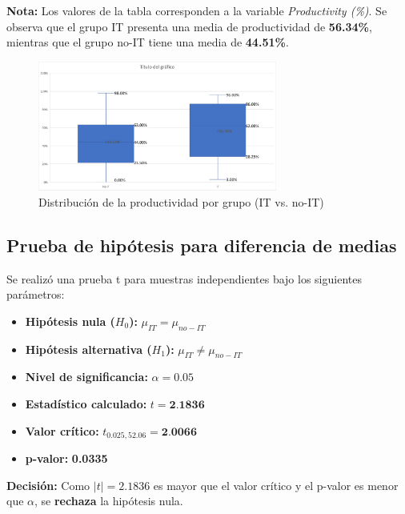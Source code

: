 \vspace{0.5cm}

\noindent
\textbf{Nota:} Los valores de la tabla corresponden a la variable \textit{Productivity (\%)}. Se observa que el grupo IT presenta una media de productividad de \textbf{56.34\%}, mientras que el grupo no-IT tiene una media de \textbf{44.51\%}.

\begin{figure}[H]
    \centering
    \includegraphics[width=0.7\textwidth]{assets/Boxplot.png}
    \caption{Distribución de la productividad por grupo (IT vs. no-IT)}
\end{figure}

\subsection{Prueba de hipótesis para diferencia de medias}

Se realizó una prueba t para muestras independientes bajo los siguientes parámetros:

\begin{itemize}
    \item \textbf{Hipótesis nula ($H_0$):} $\mu_{IT} = \mu_{no-IT}$
    \item \textbf{Hipótesis alternativa ($H_1$):} $\mu_{IT} \neq \mu_{no-IT}$
    \item \textbf{Nivel de significancia:} $\alpha = 0.05$
    \item \textbf{Estadístico calculado:} $t = \textbf{2.1836}$
    \item \textbf{Valor crítico:} $t_{0.025, 52.06} = \textbf{2.0066}$
    \item \textbf{p-valor:} \textbf{0.0335}
\end{itemize}

\noindent
\textbf{Decisión:} Como $|t| = 2.1836$ es mayor que el valor crítico y el p-valor es menor que $\alpha$, se \textbf{rechaza} la hipótesis nula.

